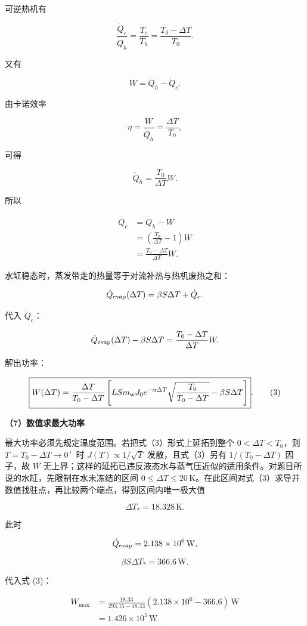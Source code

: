 \documentclass[12pt,a4paper,UTF8]{ctexart}
\begin{document}
可逆热机有

\[
\frac{\dot Q_c}{\dot Q_h}=\frac{T_c}{T_h}
=\frac{T_0-\Delta T}{T_0}.
\]

又有

\[
W=\dot Q_h-\dot Q_c.
\]

由卡诺效率

\[
\eta=\frac{W}{\dot Q_h}=\frac{\Delta T}{T_0},
\]

可得

\[
\dot Q_h=\frac{T_0}{\Delta T}W.
\]

所以

\[
\begin{aligned}
\dot Q_c
&=\dot Q_h-W\\
&=\left(\frac{T_0}{\Delta T}-1\right)W\\
&=\frac{T_0-\Delta T}{\Delta T}W.
\end{aligned}
\]

水缸稳态时，蒸发带走的热量等于对流补热与热机废热之和：

\[
\dot Q_{\rm evap}(\Delta T)
=\beta S\Delta T+\dot Q_c.
\]

代入 \(\dot Q_c\)：

\[
\dot Q_{\rm evap}(\Delta T)-\beta S\Delta T
=\frac{T_0-\Delta T}{\Delta T}W.
\]

解出功率：

\[
\boxed{
W(\Delta T)
=\frac{\Delta T}{T_0-\Delta T}
\left[
LSm_{\rm w}J_0e^{-\alpha\Delta T}
\sqrt{\frac{T_0}{T_0-\Delta T}}
-\beta S\Delta T
\right]
}. \tag{3}
\]

\textbf{（7）数值求最大功率}

最大功率必须先规定温度范围。若把式（3）形式上延拓到整个
\(0<\Delta T<T_0\)，则 \(T=T_0-\Delta T\to0^+\) 时
\(J(T)\propto1/\sqrt T\) 发散，且式（3）另有 \(1/(T_0-\Delta T)\)
因子，故 \(W\)
无上界；这样的延拓已违反液态水与蒸气压近似的适用条件。对题目所说的水缸，先限制在水未冻结的区间
\(0\leq\Delta T\leq20\,\mathrm K\)。在此区间对式（3）求导并数值找驻点，再比较两个端点，得到区间内唯一极大值

\[
\Delta T_*=18.328\,\mathrm K.
\]

此时

\[
\dot Q_{\rm evap}=2.138\times10^6\,\mathrm W,
\]

\[
\beta S\Delta T_*=366.6\,\mathrm W.
\]

代入式 (3)：

\[
\begin{aligned}
W_{\max}
&=\frac{18.33}{293.15-18.33}
\left(2.138\times10^6-366.6\right)\,\mathrm W\\
&=1.426\times10^5\,\mathrm W.
\end{aligned}
\]
\end{document}
